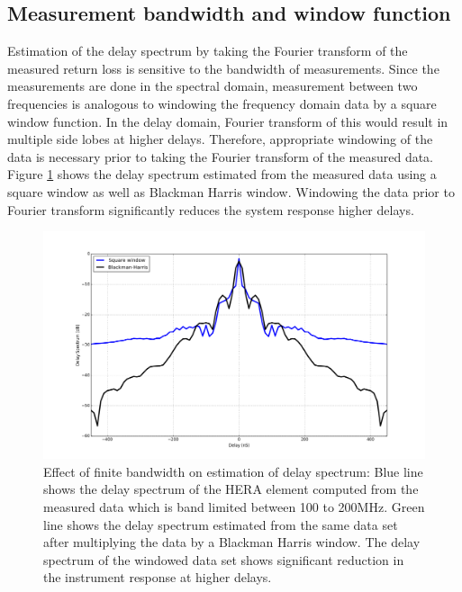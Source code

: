 \documentclass[twocolumn]{emulateapj}
\begin{document}
\subsection{Measurement bandwidth and window function}
Estimation of the delay spectrum by taking the Fourier transform of the measured return loss is sensitive to the bandwidth of measurements. Since the measurements are done in the spectral domain, measurement between two frequencies is analogous to windowing the frequency domain data by a square window function. In the delay domain, Fourier transform of this would result in multiple side lobes at higher delays. Therefore, appropriate windowing of the data is  necessary prior to taking the Fourier transform of the measured data. Figure \ref{fig:window} shows the delay spectrum estimated from the measured data using a square window as well as Blackman Harris window. Windowing the data prior to Fourier transform significantly reduces the system response higher delays.  
\begin{figure}
\centering
\includegraphics[width=\linewidth]{GB_reflectometry_part3/plot/ds_window.png}
\caption{Effect of finite bandwidth on estimation of delay spectrum: Blue line shows the delay spectrum of the HERA element computed from the measured data which is band limited between 100 to 200MHz. Green line shows the delay spectrum estimated from the same data set after multiplying the data by a Blackman Harris window. The delay spectrum of the windowed data set shows significant reduction in the instrument response at higher delays.}
\label{fig:window}
\end{figure} 
\end{document}
